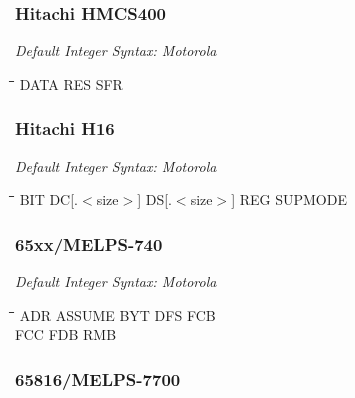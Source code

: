 \subsubsection{Hitachi HMCS400}

{\em Default Integer Syntax: Motorola}

{\tt\begin{tabbing}
\hspace{3cm}\=\hspace{3cm}\=\hspace{3cm}\=\hspace{3cm}\=\kill
DATA       \> RES         \> SFR \\
\end{tabbing}}

\subsubsection{Hitachi H16}

{\em Default Integer Syntax: Motorola}

{\tt\begin{tabbing}
\hspace{3cm}\=\hspace{3cm}\=\hspace{3cm}\=\hspace{3cm}\=\kill
BIT        \> DC[.$<$size$>$]    \> DS[.$<$size$>$]   \> REG       \> SUPMODE \\
\end{tabbing}}

\subsubsection{65xx/MELPS-740}

{\em Default Integer Syntax: Motorola}

{\tt\begin{tabbing}
\hspace{3cm}\=\hspace{3cm}\=\hspace{3cm}\=\hspace{3cm}\=\kill
ADR        \> ASSUME      \> BYT         \> DFS         \> FCB \\
FCC        \> FDB         \> RMB \\
\end{tabbing}}

\subsubsection{65816/MELPS-7700}


